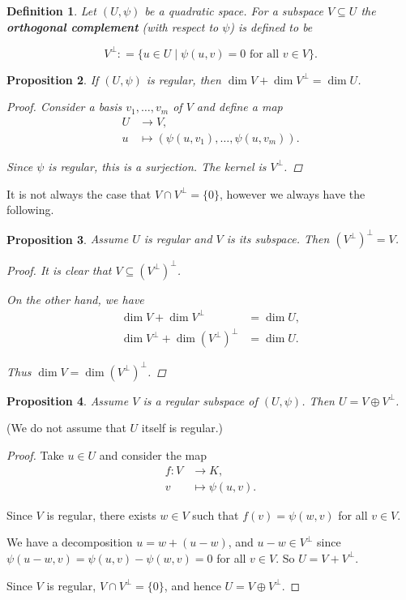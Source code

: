 \documentclass{article}
\newcommand{\term}{\textbf}
\newcommand{\dfn}{\mathrel{\mathop:}=}
\theoremstyle{myplain}
\newtheorem{proposition}{Proposition}[section]
\theoremstyle{mydefinition}
\newtheorem{definition}[proposition]{Definition}
\begin{document}
\begin{definition}
  Let $(U,\psi)$ be a quadratic space. For a subspace $V \subseteq U$ the
  \term{orthogonal complement} (with respect to $\psi$) is defined to be

  \[ V^\perp \dfn \{ u\in U \mid \psi (u,v) = 0 \text{ for all } v\in V \}. \]
\end{definition}

\begin{proposition}
  If $(U,\psi)$ is regular, then $\dim V + \dim V^\perp = \dim U$.

  \begin{proof}
    Consider a basis $v_1, \ldots, v_m$ of $V$ and define a map
    \begin{align*}
      U & \to V,\\
      u & \mapsto (\psi (u,v_1), \ldots, \psi (u,v_m)).
    \end{align*}

    Since $\psi$ is regular, this is a surjection. The kernel is $V^\perp$.
  \end{proof}
\end{proposition}

It is not always the case that $V \cap V^\perp = \{ 0 \}$, however we always
have the following.

\begin{proposition}
  Assume $U$ is regular and $V$ is its subspace. Then $(V^\perp)^\perp = V$.

  \begin{proof}
    It is clear that $V \subseteq (V^\perp)^\perp$.

    On the other hand, we have
    \begin{align*}
      \dim V + \dim V^\perp & = \dim U,\\
      \dim V^\perp + \dim (V^\perp)^\perp & = \dim U.
    \end{align*}

    Thus $\dim V = \dim (V^\perp)^\perp$.
  \end{proof}
\end{proposition}

\begin{proposition}
  Assume $V$ is a regular subspace of $(U,\psi)$. Then $U = V \oplus V^\perp$.
\end{proposition}

\noindent (We do not assume that $U$ itself is regular.)

\begin{proof}
  Take $u\in U$ and consider the map
  \begin{align*}
    f\colon V & \to K,\\
    v & \mapsto \psi (u,v).
  \end{align*}

  Since $V$ is regular, there exists $w\in V$ such that $f (v) = \psi (w,v)$ for
  all $v \in V$.

  We have a decomposition $u = w + (u-w)$, and $u-w \in V^\perp$ since
  $\psi (u-w, v) = \psi (u,v) - \psi (w,v) = 0$ for all $v\in V$.
  So $U = V + V^\perp$.

  Since $V$ is regular, $V\cap V^\perp = \{ 0 \}$, and hence
  $U = V \oplus V^\perp$.
\end{proof}
\end{document}
